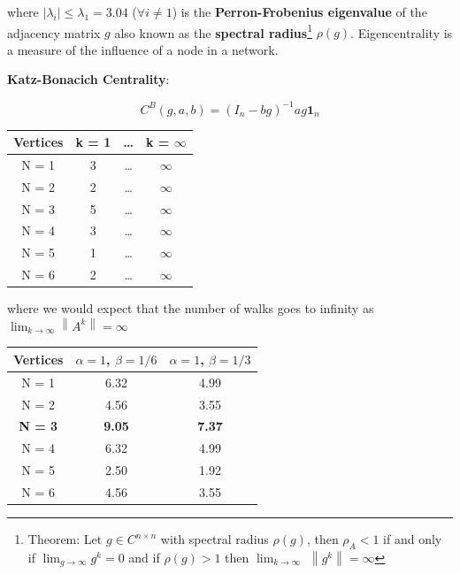 \documentclass[a4paper]{article}
\begin{document}
where $|\lambda_i| \le \lambda_1 = 3.04$ ($\forall i\ne 1$) is the \textbf{Perron-Frobenius eigenvalue} of the adjacency matrix $g$ also known as the \textbf{spectral radius}\footnote{Theorem: Let $g \in C^{n\times n}$ with spectral radius $\rho(g)$, then $\rho_A < 1$ if and only if $\lim_{g\to\infty} g^k = 0$ and if $\rho(g) > 1$ then $\lim_{k\to\infty}$  $\left\| g^k \right\| = \infty$  } $\rho(g)$. Eigencentrality is a measure of the influence of a node in a network. 

\vspace{3cm}
\noindent \textbf{{\color{blue} Katz-Bonacich Centrality}}:

\begin{equation}
C^B(g,a,b) = (I_n - bg)^{-1}ag\textbf{1}_n
\end{equation}

\begin{table}[ht!]
	\centering
	 \label{tab:title} 
	\begin{tabular}{cccc}
		
		Vertices &  k = 1 & \dots & k = $\infty$\\
		\hline\hline
		N = 1 & 3 & \dots &  $\infty$ \\
		N = 2 & 2 & \dots &  $\infty$ \\
		N = 3 & 5 & \dots &  $\infty$ \\
		N = 4 & 3 & \dots &  $\infty$\\
		N = 5 & 1 & \dots &  $\infty$ \\
		N = 6 & 2 & \dots &  $\infty$ \\

		\bottomrule[1pt]
	\end{tabular}
\end{table}

where we would expect that the number of walks goes to infinity as $\lim_{k\to\infty} \left\| A^k \right\| = \infty$

\begin{table}[ht!]
	\centering
	 \label{tab:title} 
	\begin{tabular}{ccc}
		\hline
		
		Vertices & $\alpha = 1$, $\beta = 1/6$ & $\alpha = 1$, $\beta = 1/3$\\
		\hline\hline
		N = 1 & 6.32  &  4.99 \\ 
		N = 2 & 4.56  & 3.55 \\
		\textbf{{\color{blue} N = 3}} & \textbf{{\color{blue} 9.05}} &  \textbf{{\color{blue} 7.37}} \\
		N = 4 & 6.32 & 4.99 \\
		N = 5 & 2.50 & 1.92 \\
		N = 6 & 4.56 & 3.55 \\
		
		\bottomrule[1pt]
	\end{tabular}
\end{table}
\end{document}
